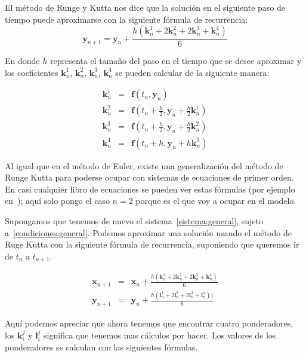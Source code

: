 El método de Runge y Kutta nos dice que la solución en el siguiente paso de tiempo puede aproximarse con la siguiente fórmula de recurrencia:
$$\textbf{y}_{n+1} = \textbf{y}_n + \frac{h \left(\textbf{k}_{n}^{1} + 2\textbf{k}_{n}^{2} + 2\textbf{k}_{n}^{3} + \textbf{k}_{n}^{4} \right)}{6} $$
 
En donde $h$ representa el tamaño del paso en el tiempo que se desee aproximar y los coeficientes $\textbf{k}_{n}^{1}$, $\textbf{k}_{n}^{2}$, $\textbf{k}_{n}^{3}$, $\textbf{k}_{n}^{4}$ se pueden calcular de la siguiente manera:

\begin{eqnarray}
\textbf{k}_{n}^{1} & = & \textbf{f}(t_n, \textbf{y}_n) \nonumber \\
\textbf{k}_{n}^{2} & = & \textbf{f}(t_n + \frac{h}{2}, \textbf{y}_n + \frac{h}{2} \textbf{k}_{n}^{1}) \nonumber \\
\textbf{k}_{n}^{3} & = & \textbf{f}(t_n + \frac{h}{2}, \textbf{y}_n + \frac{h}{2} \textbf{k}_{n}^{2}) \nonumber \\
\textbf{k}_{n}^{4} & = & \textbf{f}(t_n + h, \textbf{y}_n + h\textbf{k}_{n}^{3}) \nonumber
\end{eqnarray}

Al igual que en el método de Euler, existe una generalización del método de Runge Kutta para poderse ocupar con sistemas de ecuaciones de primer orden.
En casi cualquier libro de ecuaciones se pueden ver estas fórmulas (por ejemplo en~\cite{Blanchard:Ecuaciones}); aquí solo pongo el caso $n=2$ porque es el que voy a ocupar en el modelo.

Supongamos que tenemos de nuevo el sistema~\eqref{sistema:general}, sujeto a~\eqref{condiciones:general}.
Podemos aproximar una solución usando el método de Ruge Kutta con la siguiente fórmula de recurrencia, suponiendo que queremos ir de $t_n$ a $t_{n+1}$.

\begin{eqnarray}
\textbf{x}_{n+1} & = & \textbf{x}_n + \frac{h(\textbf{k}_{n}^{1} + 2\textbf{k}_{n}^{2} + 2\textbf{k}_{n}^{3} + \textbf{k}_{n}^{4})}{6} \nonumber \\
\textbf{y}_{n+1} & = & \textbf{y}_n + \frac{h(\textbf{l}_{n}^{1} + 2\textbf{l}_{n}^{2} + 2\textbf{l}_{n}^{3} + \textbf{l}_{n}^{4}))}{6} \nonumber
\end{eqnarray}

Aquí podemos apreciar que ahora tenemos que encontrar cuatro ponderadores, los $\textbf{k}_{i}^{j}$ y $\textbf{l}_{i}^{j}$ significa que tenemos mas cálculos por hacer.
Los valores de los ponderadores se calculan con las siguientes fórmulas.

